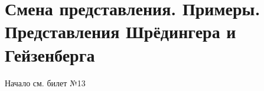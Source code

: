 \newpage
\chapter{Смена представления. Примеры. Представления Шрёдингера и Гейзенберга}
\par Начало см. билет №13
\par 